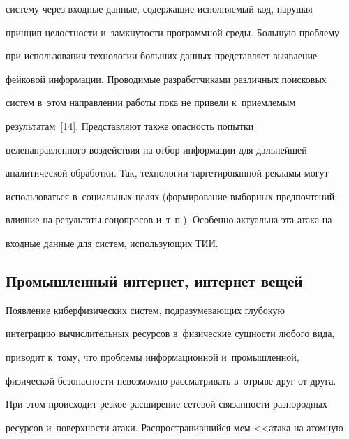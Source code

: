 систему через входные данные, содержащие исполняемый код, нарушая 


принцип це\-лост\-ности и~замкнутости программной среды. Большую проблему 


при использовании технологии больших данных представляет выявление 


фейковой информации. Проводимые разработчиками различных поисковых 


систем в~этом направлении работы пока не привели к~приемлемым 


результатам~[14]. Представляют также опасность попытки 


целенаправленного воздействия на отбор информации для дальнейшей 


аналитической обработки. Так, технологии таргетированной рекламы могут 


использоваться в~социальных целях (формирование выборных предпочтений, 


влияние на результаты соцопросов и~т.\,п.). Особенно актуальна эта атака на 


входные данные для систем, использующих ТИИ. 





\vspace*{-4pt}





\subsection{Промышленный интернет, интернет вещей}





\vspace*{-2pt}





   Появление киберфизических систем, подразумевающих глубокую 


интеграцию вычислительных ресурсов в~физические сущности любого вида, 


приводит к~тому, что проблемы информационной и~промышленной, 


физической безопас\-ности невозможно рассматривать в~отрыве друг от друга. 


При этом происходит резкое расширение сетевой связанности разнородных 


ресурсов и~поверхности атаки. Распространившийся мем <<атака на атомную 


